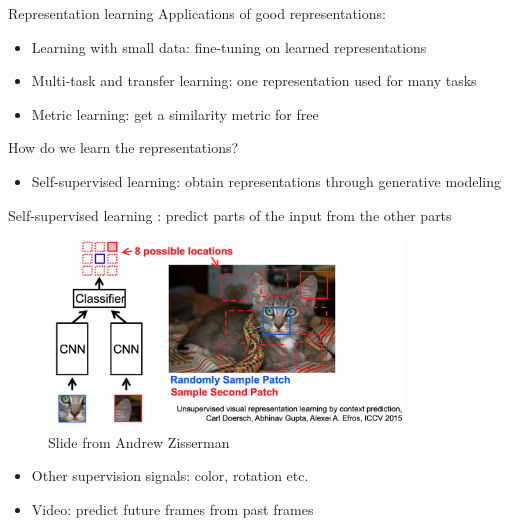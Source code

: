 \documentclass[usenames,dvipsnames,11pt,aspectratio=169]{beamer}
\begin{document}
\begin{frame}
    {Representation learning}
    Applications of good representations:\\
    \begin{itemize}
        \item Learning with small data: fine-tuning on learned representations
        \item Multi-task and transfer learning: one representation used for many tasks 
        \item Metric learning: get a similarity metric for free 
    \end{itemize}

    How do we learn the representations?
    \begin{itemize}
        \item Self-supervised learning: obtain representations through generative modeling
    \end{itemize}
\end{frame}

\begin{frame}
    {Self-supervised learning}
    : predict parts of the input from the other parts
    \vspace{-2em}
    \begin{figure}
        \includegraphics[height=5cm]{figures/image-self}
        \caption{Slide from Andrew Zisserman}
    \end{figure}
    \vspace{-2em}
    \begin{itemize}
        \item Other supervision signals: color, rotation etc.
        \item Video: predict future frames from past frames
    \end{itemize}
\end{frame}
\end{document}
